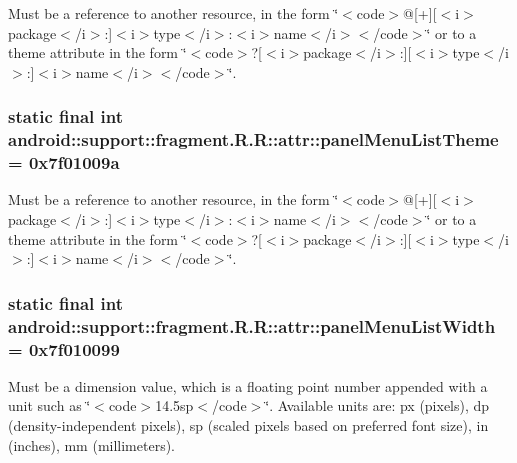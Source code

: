 Must be a reference to another resource, in the form \char`\"{}$<$code$>$@\mbox{[}+\mbox{]}\mbox{[}$<$i$>$package$<$/i$>$:\mbox{]}$<$i$>$type$<$/i$>$:$<$i$>$name$<$/i$>$$<$/code$>$\char`\"{} or to a theme attribute in the form \char`\"{}$<$code$>$?\mbox{[}$<$i$>$package$<$/i$>$:\mbox{]}\mbox{[}$<$i$>$type$<$/i$>$:\mbox{]}$<$i$>$name$<$/i$>$$<$/code$>$\char`\"{}. \hypertarget{classandroid_1_1support_1_1fragment_1_1_r_1_1attr_2ccf1588944a6cfa42cea07ed7ae1b65}{
\subsubsection[{panelMenuListTheme}]{\setlength{\rightskip}{0pt plus 5cm}static final int android::support::fragment.R.R::attr::panelMenuListTheme = 0x7f01009a}}
\label{classandroid_1_1support_1_1fragment_1_1_r_1_1attr_2ccf1588944a6cfa42cea07ed7ae1b65}


Must be a reference to another resource, in the form \char`\"{}$<$code$>$@\mbox{[}+\mbox{]}\mbox{[}$<$i$>$package$<$/i$>$:\mbox{]}$<$i$>$type$<$/i$>$:$<$i$>$name$<$/i$>$$<$/code$>$\char`\"{} or to a theme attribute in the form \char`\"{}$<$code$>$?\mbox{[}$<$i$>$package$<$/i$>$:\mbox{]}\mbox{[}$<$i$>$type$<$/i$>$:\mbox{]}$<$i$>$name$<$/i$>$$<$/code$>$\char`\"{}. \hypertarget{classandroid_1_1support_1_1fragment_1_1_r_1_1attr_a0895b0dff80cded1e75cdb01059a2db}{
\subsubsection[{panelMenuListWidth}]{\setlength{\rightskip}{0pt plus 5cm}static final int android::support::fragment.R.R::attr::panelMenuListWidth = 0x7f010099}}
\label{classandroid_1_1support_1_1fragment_1_1_r_1_1attr_a0895b0dff80cded1e75cdb01059a2db}


Must be a dimension value, which is a floating point number appended with a unit such as \char`\"{}$<$code$>$14.5sp$<$/code$>$\char`\"{}. Available units are: px (pixels), dp (density-independent pixels), sp (scaled pixels based on preferred font size), in (inches), mm (millimeters). 

